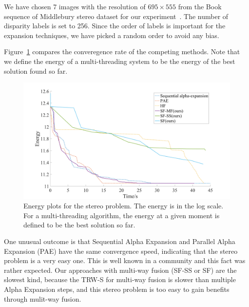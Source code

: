 
\noindent We have chosen 7 images with the resolution of $695\times555$
from the Book sequence of Middlebury stereo dataset for our
experiment~\cite{middlebury_stereo}. The number of disparity labels is
set to 256.
%
Since the order of labels is important for the expansion techniques,
we have picked a random order to avoid any bias.
%



Figure~\ref{fig:stereo_global} compares the converegence rate of the
competing methods. Note that we define the energy of a multi-threading
system to be the energy of the best solution found so far.
%
\begin{figure}[tb]
  \includegraphics[width=\columnwidth]{figure/stereo_global.png}
 \caption{Energy plots for the stereo problem. The energy is in the log
 scale. For a multi-threading algorithm, the energy at a given moment is
 defined to be the best solution so far.} \label{fig:stereo_global}
\end{figure}
%
One unusual outcome is that Sequential Alpha Expansion and Parallel
Alpha Expansion (PAE) have the same convergence speed, indicating that
the stereo problem is a very easy one. This is well known in a community
and this fact was rather expected. Our approaches with multi-way fusion
(SF-SS or SF) are the slowest kind, because the TRW-S for multi-way
fusion is slower than multiple Alpha Expansion steps, and this stereo
problem is too easy to gain benefits through mulit-way fusion.
%
